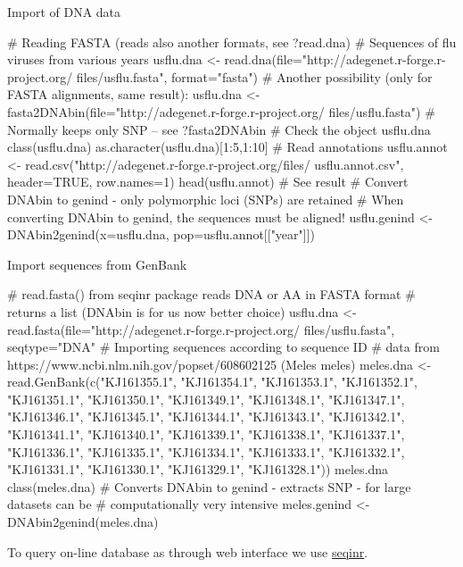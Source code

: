 \documentclass[compress, ucs, xelatex, 11pt, xcolor=svgnames,
  hyperref={
    bookmarks=true,
    unicode=true,
    colorlinks=true,
    pdftitle={Molecular data in R},
    plainpages=false,
    pdfauthor={Vojtech Zeisek},
    pdfsubject={Course about phylogeny and evolution in R},
    pdfcreator={XeLaTeX},
    pdfkeywords={R, evolution, phylogeny, molecular data},
    linkcolor=Tomato,
    anchorcolor=SaddleBrown,
    citecolor=Goldenrod,
    filecolor=DarkMagenta,
    menucolor=Sienna,
    urlcolor=DarkTurquoise,
    pdftex},
  url={hyphens, lowtilde} %
  ]{beamer}
\begin{document}
\begin{frame}[fragile]{Import of DNA data}
  \begin{spluscode}
    # Reading FASTA (reads also another formats, see ?read.dna)
    # Sequences of flu viruses from various years
    usflu.dna <- read.dna(file="http://adegenet.r-forge.r-project.org/
      files/usflu.fasta", format="fasta")
    # Another possibility (only for FASTA alignments, same result):
    usflu.dna <- fasta2DNAbin(file="http://adegenet.r-forge.r-project.org/
      files/usflu.fasta") # Normally keeps only SNP -- see ?fasta2DNAbin
    # Check the object
    usflu.dna
    class(usflu.dna)
    as.character(usflu.dna)[1:5,1:10]
    # Read annotations
    usflu.annot <- read.csv("http://adegenet.r-forge.r-project.org/files/
      usflu.annot.csv", header=TRUE, row.names=1)
    head(usflu.annot) # See result
    # Convert DNAbin to genind - only polymorphic loci (SNPs) are retained
    # When converting DNAbin to genind, the sequences must be aligned!
    usflu.genind <- DNAbin2genind(x=usflu.dna, pop=usflu.annot[["year"]])
  \end{spluscode}
\end{frame}

\begin{frame}[fragile]{Import sequences from GenBank}
  \begin{spluscode}
    # read.fasta() from seqinr package reads DNA or AA in FASTA format
    # returns a list (DNAbin is for us now better choice)
    usflu.dna <- read.fasta(file="http://adegenet.r-forge.r-project.org/
      files/usflu.fasta", seqtype="DNA"
    # Importing sequences according to sequence ID
    # data from https://www.ncbi.nlm.nih.gov/popset/608602125 (Meles meles)
    meles.dna <- read.GenBank(c("KJ161355.1", "KJ161354.1", "KJ161353.1",
      "KJ161352.1", "KJ161351.1", "KJ161350.1", "KJ161349.1", "KJ161348.1",
      "KJ161347.1", "KJ161346.1", "KJ161345.1", "KJ161344.1", "KJ161343.1",
      "KJ161342.1", "KJ161341.1", "KJ161340.1", "KJ161339.1", "KJ161338.1",
      "KJ161337.1", "KJ161336.1", "KJ161335.1", "KJ161334.1", "KJ161333.1",
      "KJ161332.1", "KJ161331.1", "KJ161330.1", "KJ161329.1", "KJ161328.1"))
    meles.dna
    class(meles.dna)
    # Converts DNAbin to genind - extracts SNP - for large datasets can be
    # computationally very intensive
    meles.genind <- DNAbin2genind(meles.dna)
  \end{spluscode}
To query on-line database as through web interface we use \href{https://cran.r-project.org/web/packages/seqinr/index.html}{seqinr}.
\end{frame}
\end{document}
